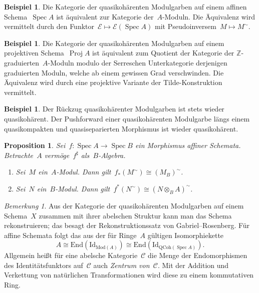 \documentclass[a4paper,ngerman,12pt]{scrartcl}
\theoremstyle{definition}
\newtheorem{ex}[defn]{Beispiel}
\theoremstyle{plain}
\newtheorem{prop}[defn]{Proposition}
\theoremstyle{remark}
\newtheorem{rem}[defn]{Bemerkung}
\newcommand{\ZZ}{\mathbb{Z}}
\newcommand{\C}{\mathcal{C}}
\newcommand{\E}{\mathcal{E}}
\DeclareMathOperator{\Spec}{Spec}
\DeclareMathOperator{\Proj}{Proj}
\begin{document}
\begin{ex}Die Kategorie der quasikohärenten Modulgarben auf einem affinen
Schema~$\Spec A$ ist äquivalent zur Kategorie der~$A$-Moduln. Die Äquivalenz
wird vermittelt durch den Funktor~$\E \mapsto \E(\Spec A)$ mit
Pseudoinversem~$M \mapsto M^\sim$.\end{ex}

\begin{ex}Die Kategorie der quasikohärenten Modulgarben auf einem projektiven
Schema~$\Proj A$ ist äquivalent zum Quotient der Kategorie der
$\ZZ$-graduierten~$A$-Moduln modulo der Serreschen Unterkategorie derjenigen
graduierten Moduln, welche ab einem gewissen Grad verschwinden. Die Äquivalenz
wird durch eine projektive Variante der Tilde-Konstruktion vermittelt.\end{ex}

\begin{ex}Der Rückzug quasikohärenter Modulgarben ist stets wieder
quasikohärent. Der Pushforward einer quasikohärenten Modulgarbe längs einem
quasikompakten und quasiseparierten Morphismus ist wieder
quasikohärent.\end{ex}

\begin{prop}Sei~$f : \Spec A \to \Spec B$ ein Morphismus affiner Schemata.
Betrachte~$A$ vermöge~$f^\sharp$ als~$B$-Algebra.
\begin{enumerate}
\item Sei~$M$ ein~$A$-Modul. Dann gilt~$f_*(M^\sim) \cong (M_B)^\sim$.
\item Sei~$N$ ein~$B$-Modul. Dann gilt~$f^*(N^\sim) \cong (N \otimes_B
A)^\sim$.
\end{enumerate}
\end{prop}

\begin{rem}Aus der Kategorie der quasikohärenten Modulgarben auf einem
Schema~$X$ zusammen mit ihrer abelschen Struktur kann man das Schema
rekonstruieren; das besagt der Rekonstruktionssatz von Gabriel--Rosenberg. Für
affine Schemata folgt das aus der für Ringe~$A$ gültigen Isomorphiekette
\[ A \cong \mathrm{End}(\mathrm{Id}_{\mathrm{Mod}(A)})
  \cong \mathrm{End}(\mathrm{Id}_{\mathrm{QCoh}(\Spec A)}). \]
Allgemein heißt für eine abelsche Kategorie~$\C$ die Menge der Endomorphismen
des Identitätsfunktors auf~$\C$ auch \emph{Zentrum von~$\C$}. Mit der Addition
und Verkettung von natürlichen Transformationen wird diese zu einem
kommutativen Ring.
\end{rem}
\end{document}
